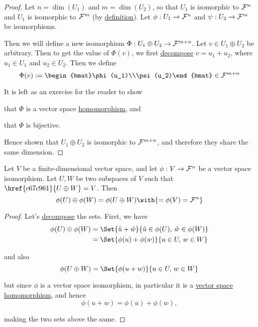 \begin{proof}
  Let $n=\dim(U_1)$ and $m=\dim(U_2)$, so that $U_1$ is isomorphic to $\mathcal F^n$ and
  $U_1$ is isomorphic to $\mathcal F^m$ (by \href{ad4a614}{definition}). Let
  $\phi:U_1\to\mathcal F^n$ and $\psi:U_2\to\mathcal F^m$ be isomorphisms.

  Then we will define a new isomorphism $\Phi:U_1\oplus U_2\to\mathcal F^{m+n}$. Let
  $v\in U_1\oplus U_2$ be arbitrary. Then to get the value of $\Phi(v)$, we
  first \href{d7c30bb}{decompose} $v=u_1+u_2$, where $u_1\in U_1$ and $u_2\in
  U_2$. Then we define
  $$
    \Phi(v):=\begin{bmat}\phi(u_1)\\\psi(u_2)\end{bmat}\in\F^{m+n}
  $$

  It is left as an exercise for the reader to show
  \begin{enumerati}
    \item that $\Phi$ is a vector space \href{eacdfee}{homomorphism}, and
    \item that $\Phi$ is bijective.
  \end{enumerati}

  Hence shown that $U_1\oplus U_2$ is isomorphic to $\mathcal F^{m+n}$, and therefore
  they share the same dimension.
\end{proof}

\label{bf5d412}

Let $V$ be a finite-dimensional vector space, and let $\phi:V\to\mathcal F^n$ be a
vector space isomorphism. Let $U,W$ be two subspaces of $V$ such that
$\href{c67c961}{U\oplus W}=V$. Then
$$
  \phi(U)\oplus\phi(W)=\phi(U\oplus W)\with{=\phi(V)=\F^n}
$$

\begin{proof}
  Let's \href{d7c30bb}{decompose} the sets. First, we have
  \begin{align*}
    \phi(U)\oplus\phi(W)
     &=\Set{\hat u+\hat w}{\hat u\in\phi(U),\,\hat w\in\phi(W)} \\
     &=\Set{\phi(u)+\phi(w)}{u\in U,\,w\in W}
  \end{align*}

  and also
  $$
    \phi(U\oplus W)=\Set{\phi(u+w)}{u\in U,\,w\in W}
  $$

  but since $\phi$ is a vector space isomorphism, in particular it is a
  \href{eacdfee}{vector space homomorphism}, and hence
  $$
    \phi(u+w)=\phi(u)+\phi(w),
  $$

  making the two sets above the same.
\end{proof}

